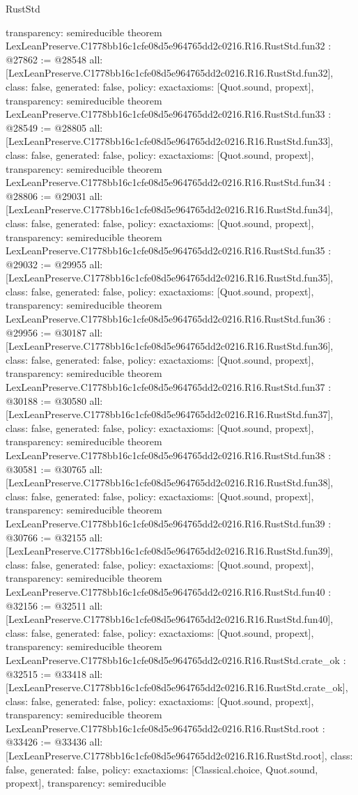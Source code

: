 \begin{lexlean}{RustStd}
\begin{coremodule}
{  transparency: semireducible
}
theorem LexLeanPreserve.C1778bb16c1cfe08d5e964765dd2c0216.R16.RustStd.fun32 : @27862 := @28548 {
  all: [LexLeanPreserve.C1778bb16c1cfe08d5e964765dd2c0216.R16.RustStd.fun32],
  class: false,
  generated: false,
  policy: exact{axioms: [Quot.sound, propext]},
  transparency: semireducible
}
theorem LexLeanPreserve.C1778bb16c1cfe08d5e964765dd2c0216.R16.RustStd.fun33 : @28549 := @28805 {
  all: [LexLeanPreserve.C1778bb16c1cfe08d5e964765dd2c0216.R16.RustStd.fun33],
  class: false,
  generated: false,
  policy: exact{axioms: [Quot.sound, propext]},
  transparency: semireducible
}
theorem LexLeanPreserve.C1778bb16c1cfe08d5e964765dd2c0216.R16.RustStd.fun34 : @28806 := @29031 {
  all: [LexLeanPreserve.C1778bb16c1cfe08d5e964765dd2c0216.R16.RustStd.fun34],
  class: false,
  generated: false,
  policy: exact{axioms: [Quot.sound, propext]},
  transparency: semireducible
}
theorem LexLeanPreserve.C1778bb16c1cfe08d5e964765dd2c0216.R16.RustStd.fun35 : @29032 := @29955 {
  all: [LexLeanPreserve.C1778bb16c1cfe08d5e964765dd2c0216.R16.RustStd.fun35],
  class: false,
  generated: false,
  policy: exact{axioms: [Quot.sound, propext]},
  transparency: semireducible
}
theorem LexLeanPreserve.C1778bb16c1cfe08d5e964765dd2c0216.R16.RustStd.fun36 : @29956 := @30187 {
  all: [LexLeanPreserve.C1778bb16c1cfe08d5e964765dd2c0216.R16.RustStd.fun36],
  class: false,
  generated: false,
  policy: exact{axioms: [Quot.sound, propext]},
  transparency: semireducible
}
theorem LexLeanPreserve.C1778bb16c1cfe08d5e964765dd2c0216.R16.RustStd.fun37 : @30188 := @30580 {
  all: [LexLeanPreserve.C1778bb16c1cfe08d5e964765dd2c0216.R16.RustStd.fun37],
  class: false,
  generated: false,
  policy: exact{axioms: [Quot.sound, propext]},
  transparency: semireducible
}
theorem LexLeanPreserve.C1778bb16c1cfe08d5e964765dd2c0216.R16.RustStd.fun38 : @30581 := @30765 {
  all: [LexLeanPreserve.C1778bb16c1cfe08d5e964765dd2c0216.R16.RustStd.fun38],
  class: false,
  generated: false,
  policy: exact{axioms: [Quot.sound, propext]},
  transparency: semireducible
}
theorem LexLeanPreserve.C1778bb16c1cfe08d5e964765dd2c0216.R16.RustStd.fun39 : @30766 := @32155 {
  all: [LexLeanPreserve.C1778bb16c1cfe08d5e964765dd2c0216.R16.RustStd.fun39],
  class: false,
  generated: false,
  policy: exact{axioms: [Quot.sound, propext]},
  transparency: semireducible
}
theorem LexLeanPreserve.C1778bb16c1cfe08d5e964765dd2c0216.R16.RustStd.fun40 : @32156 := @32511 {
  all: [LexLeanPreserve.C1778bb16c1cfe08d5e964765dd2c0216.R16.RustStd.fun40],
  class: false,
  generated: false,
  policy: exact{axioms: [Quot.sound, propext]},
  transparency: semireducible
}
theorem LexLeanPreserve.C1778bb16c1cfe08d5e964765dd2c0216.R16.RustStd.crate_ok : @32515 := @33418 {
  all: [LexLeanPreserve.C1778bb16c1cfe08d5e964765dd2c0216.R16.RustStd.crate_ok],
  class: false,
  generated: false,
  policy: exact{axioms: [Quot.sound, propext]},
  transparency: semireducible
}
theorem LexLeanPreserve.C1778bb16c1cfe08d5e964765dd2c0216.R16.RustStd.root : @33426 := @33436 {
  all: [LexLeanPreserve.C1778bb16c1cfe08d5e964765dd2c0216.R16.RustStd.root],
  class: false,
  generated: false,
  policy: exact{axioms: [Classical.choice, Quot.sound, propext]},
  transparency: semireducible
}


\end{coremodule}
\end{lexlean}

